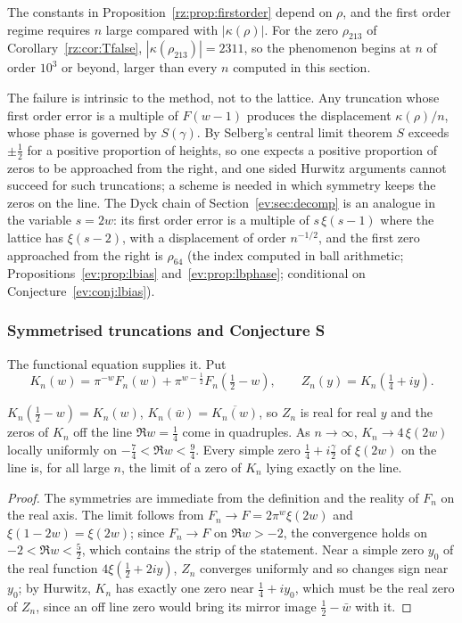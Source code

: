 \begin{remark}\label{rz:rem:firstordergap}
The constants in Proposition~\ref{rz:prop:firstorder} depend on $\rho$, and the first order regime requires $n$ large compared with $|\kappa(\rho)|$. For the zero $\rho_{213}$ of Corollary~\ref{rz:cor:Tfalse}, $|\kappa(\rho_{213})|=2311$, so the phenomenon begins at $n$ of order $10^3$ or beyond, larger than every $n$ computed in this section.
\end{remark}

The failure is intrinsic to the method, not to the lattice. Any truncation whose first order error is a multiple of $F(w-1)$ produces the displacement $\kappa(\rho)/n$, whose phase is governed by $S(\gamma)$. By Selberg's central limit theorem \cite{Selberg46} $S$ exceeds $\pm\frac12$ for a positive proportion of heights, so one expects a positive proportion of zeros to be approached from the right, and one sided Hurwitz arguments cannot succeed for such truncations; a scheme is needed in which symmetry keeps the zeros on the line. The Dyck chain of Section~\ref{ev:sec:decomp} is an analogue in the variable $s=2w$: its first order error is a multiple of $s\,\xi(s-1)$ where the lattice has $\xi(s-2)$, with a displacement of order $n^{-1/2}$, and the first zero approached from the right is $\rho_{64}$ (the index computed in ball arithmetic; Propositions~\ref{ev:prop:lbias} and~\ref{ev:prop:lbphase}; conditional on Conjecture~\ref{ev:conj:lbias}).

\subsubsection{Symmetrised truncations and Conjecture S}

The functional equation supplies it. Put
\[
K_n(w)=\pi^{-w}F_n(w)+\pi^{w-\frac12}F_n(\tfrac12-w),\qquad Z_n(y)=K_n(\tfrac14+iy).
\]

\begin{proposition}\label{rz:prop:symtrunc}
$K_n(\frac12-w)=K_n(w)$, $K_n(\bar w)=\overline{K_n(w)}$, so $Z_n$ is real for real $y$ and the zeros of $K_n$ off the line $\Re w=\frac14$ come in quadruples. As $n\to\infty$, $K_n\to4\,\xi(2w)$ locally uniformly on $-\frac74<\Re w<\frac94$. Every simple zero $\frac14+i\frac\gamma2$ of $\xi(2w)$ on the line is, for all large $n$, the limit of a zero of $K_n$ lying exactly on the line.
\end{proposition}

\begin{proof}
The symmetries are immediate from the definition and the reality of $F_n$ on the real axis. The limit follows from $F_n\to F=2\pi^w\xi(2w)$ and $\xi(1-2w)=\xi(2w)$; since $F_n\to F$ on $\Re w>-2$, the convergence holds on $-2<\Re w<\frac52$, which contains the strip of the statement. Near a simple zero $y_0$ of the real function $4\xi(\frac12+2iy)$, $Z_n$ converges uniformly and so changes sign near $y_0$; by Hurwitz, $K_n$ has exactly one zero near $\frac14+iy_0$, which must be the real zero of $Z_n$, since an off line zero would bring its mirror image $\frac12-\bar w$ with it.
\end{proof}

